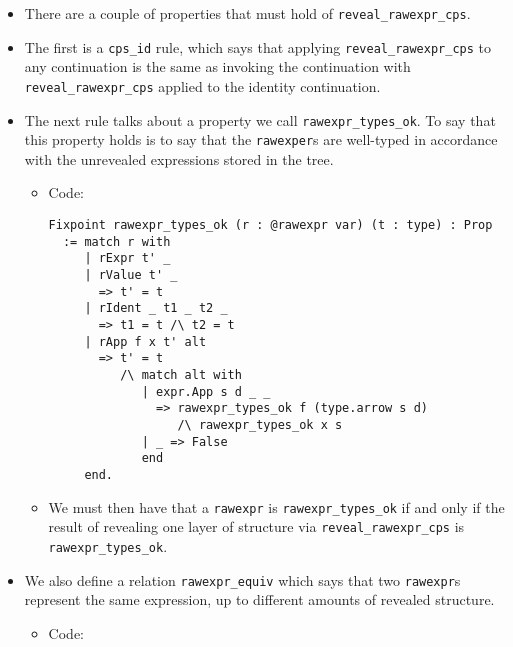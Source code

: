 \documentclass[
]{article}
\providecommand{\tightlist}{%
  \setlength{\itemsep}{0pt}\setlength{\parskip}{0pt}}
\begin{document}
\begin{itemize}
\begin{itemize}
\begin{itemize}
      \begin{itemize}
      \tightlist
      \item
        There are a couple of properties that must hold of
        \texttt{reveal\_rawexpr\_cps}.
      \item
        The first is a \texttt{cps\_id} rule, which says that applying
        \texttt{reveal\_rawexpr\_cps} to any continuation is the same as
        invoking the continuation with \texttt{reveal\_rawexpr\_cps}
        applied to the identity continuation.
      \item
        The next rule talks about a property we call
        \texttt{rawexpr\_types\_ok}. To say that this property holds is
        to say that the \texttt{rawexper}s are well-typed in accordance
        with the unrevealed expressions stored in the tree.

        \begin{itemize}
        \item
          Code:

\begin{verbatim}
Fixpoint rawexpr_types_ok (r : @rawexpr var) (t : type) : Prop
  := match r with
     | rExpr t' _
     | rValue t' _
       => t' = t
     | rIdent _ t1 _ t2 _
       => t1 = t /\ t2 = t
     | rApp f x t' alt
       => t' = t
          /\ match alt with
             | expr.App s d _ _
               => rawexpr_types_ok f (type.arrow s d)
                  /\ rawexpr_types_ok x s
             | _ => False
             end
     end.
\end{verbatim}
        \item
          We must then have that a \texttt{rawexpr} is
          \texttt{rawexpr\_types\_ok} if and only if the result of
          revealing one layer of structure via
          \texttt{reveal\_rawexpr\_cps} is \texttt{rawexpr\_types\_ok}.
        \end{itemize}
      \item
        We also define a relation \texttt{rawexpr\_equiv} which says
        that two \texttt{rawexpr}s represent the same expression, up to
        different amounts of revealed structure.

        \begin{itemize}
        \item
          Code:


\end{itemize}
\end{itemize}
\end{itemize}
\end{itemize}
\end{itemize}
\end{document}

